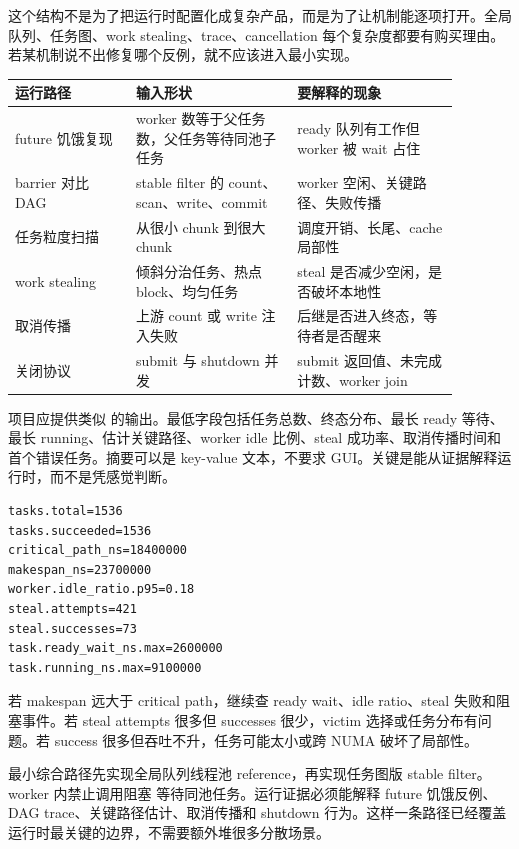 这个结构不是为了把运行时配置化成复杂产品，而是为了让机制能逐项打开。全局队列、任务图、work stealing、trace、cancellation 每个复杂度都要有购买理由。若某机制说不出修复哪个反例，就不应该进入最小实现。

\begin{center}
\begin{tabular}{p{0.24\linewidth}p{0.32\linewidth}p{0.32\linewidth}}
\toprule
运行路径 & 输入形状 & 要解释的现象 \\
\midrule
future 饥饿复现 & worker 数等于父任务数，父任务等待同池子任务 & ready 队列有工作但 worker 被 wait 占住 \\
barrier 对比 DAG & stable filter 的 count、scan、write、commit & worker 空闲、关键路径、失败传播 \\
任务粒度扫描 & 从很小 chunk 到很大 chunk & 调度开销、长尾、cache 局部性 \\
work stealing & 倾斜分治任务、热点 block、均匀任务 & steal 是否减少空闲，是否破坏本地性 \\
取消传播 & 上游 count 或 write 注入失败 & 后继是否进入终态，等待者是否醒来 \\
关闭协议 & submit 与 shutdown 并发 & submit 返回值、未完成计数、worker join \\
\bottomrule
\end{tabular}
\end{center}

项目应提供类似  的输出。最低字段包括任务总数、终态分布、最长 ready 等待、最长 running、估计关键路径、worker idle 比例、steal 成功率、取消传播时间和首个错误任务。摘要可以是 key-value 文本，不要求 GUI。关键是能从证据解释运行时，而不是凭感觉判断。

\begin{lstlisting}[numbers=none,caption={任务运行时 trace 摘要示例}]
tasks.total=1536
tasks.succeeded=1536
critical_path_ns=18400000
makespan_ns=23700000
worker.idle_ratio.p95=0.18
steal.attempts=421
steal.successes=73
task.ready_wait_ns.max=2600000
task.running_ns.max=9100000
\end{lstlisting}

若 makespan 远大于 critical path，继续查 ready wait、idle ratio、steal 失败和阻塞事件。若 steal attempts 很多但 successes 很少，victim 选择或任务分布有问题。若 success 很多但吞吐不升，任务可能太小或跨 NUMA 破坏了局部性。

最小综合路径先实现全局队列线程池 reference，再实现任务图版 stable filter。worker 内禁止调用阻塞  等待同池任务。运行证据必须能解释 future 饥饿反例、DAG trace、关键路径估计、取消传播和 shutdown 行为。这样一条路径已经覆盖运行时最关键的边界，不需要额外堆很多分散场景。


